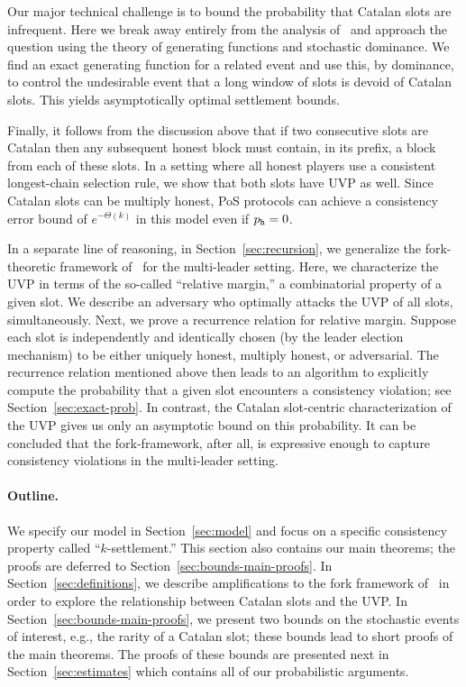 Our major technical challenge is to bound the probability that Catalan
slots are infrequent. Here we break away entirely from the analysis
of~\cite{SnowWhite} and approach the question using the theory of
generating functions and stochastic dominance. We find an exact
generating function for a related event and use this, by dominance, to
control the undesirable event that a long window of slots is devoid of
Catalan slots. This yields
asymptotically optimal settlement bounds.

Finally, it follows from the discussion above that if two consecutive
slots are Catalan then any subsequent honest block must contain, in
its prefix, a block from each of these slots.  In a setting where all
honest players use a consistent longest-chain selection rule,
we show that both slots have UVP as well.  Since Catalan slots can be
multiply honest, PoS protocols can achieve a consistency error bound
of $e^{-\Theta(k)}$ in this model even if $p_{\mathtt{h}} = 0$.

In a separate line of reasoning, in Section~\ref{sec:recursion}, 
we generalize the fork-theoretic framework of~\citet{LinearConsistency} for the multi-leader setting. 
Here, we characterize the UVP 
in terms of the so-called ``relative margin,'' 
a combinatorial property of a given slot. 
We describe an adversary who optimally attacks the UVP 
of all slots, simultaneously. 
Next, we prove a recurrence relation for relative margin. 
Suppose each slot is 
independently and identically chosen 
(by the leader election mechanism) 
to be either uniquely honest, multiply honest, or adversarial. 
The recurrence relation mentioned above then 
leads to an algorithm to explicitly compute 
the probability that 
a given slot encounters a consistency violation; 
see Section~\ref{sec:exact-prob}. 
In contrast, the Catalan slot-centric characterization of the UVP 
gives us only an asymptotic bound on this probability. 
It can be concluded that the fork-framework, after all, 
is expressive enough to capture consistency violations 
in the multi-leader setting.


\paragraph{Outline.}
We specify our model in Section~\ref{sec:model} and focus on a
specific consistency property called ``$k$-settlement.''  This section
also contains our main theorems; the proofs are deferred to
Section~\ref{sec:bounds-main-proofs}.  In
Section~\ref{sec:definitions}, we describe amplifications
to the fork framework of~\cite{LinearConsistency} in order to
explore the relationship between Catalan slots and the UVP. 
In Section~\ref{sec:bounds-main-proofs},
we present two bounds on the stochastic events of interest, e.g., the
rarity of a Catalan slot; these bounds lead to short proofs of the
main theorems.  The proofs of these bounds are presented next in
Section~\ref{sec:estimates} which contains all of our probabilistic
arguments.  

